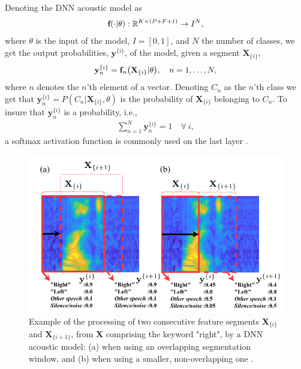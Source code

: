 Denoting the DNN acoustic model as 
\begin{align}
    \textbf{f}\qty(\cdot|\theta): \mathbb{R}^{K\times (P+F+1)} \rightarrow I^N, 
\end{align}
where \(\theta\) is the input of the model, \(I = [0,1]\), and \(N\) the number of classes, we get the output probabilities, \(\textbf{y}^{\{i\}}\), of the model, given a segment \(\textbf{X}_{\{i\}}\),
\begin{align}
    \textbf{y}_n^{\{i\}} = \textbf{f}_n\qty(\textbf{X}_{\{i\}}|\theta), \quad n = 1, \dots, N,
\end{align}
where \(n\) denotes the \(n\)'th element of a vector. Denoting \(C_n\) as the \(n\)'th class we get that \(\textbf{y}_n^{\{i\}} = P(C_n|\textbf{X}_{\{i\}}, \theta)\) is the probability of \(\textbf{X}_{\{i\}}\) belonging to \(C_n\). To insure that \(\textbf{y}_n^{\{i\}}\) is a probability, i.e., 
\begin{align}
    \sum_{n=1}^N \textbf{y}_n^{\{i\}} = 1 \quad \forall \ i,
\end{align}
a softmax activation function \cite{rothman2020artificial} is commonly used on the last layer \cite{lopez2021deep}.

\begin{figure}[h]
    \centering
    \includegraphics[width=\textwidth]{incl/img/kws/acoustic_model.png}
    \caption{Example of the processing of two consecutive feature segments \(\textbf{X}_{\{i\}}\) and \(\textbf{X}_{\{i +1\}}\), from \(\textbf{X}\) comprising the keyword "right", by a DNN acoustic model: (a) when using an overlapping segmentation window, and (b) when using a smaller, non-overlapping one \cite{lopez2021deep}. }
    \label{fig:acoustic_model}
\end{figure}

